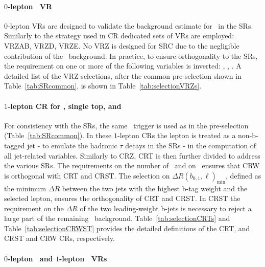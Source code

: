 		\paragraph{$0$-lepton \Zjets\ VR}

			$0$-lepton \acp{VR} are designed to validate the background estimate for \Zjets\ in the \acp{SR}. Similarly to the strategy used in \ac{CR} dedicated sets of \acp{VR} are employed: VRZAB, VRZD, VRZE. No VRZ is designed for SRC due to the negligible contribution of the \Zboson\ background. In practice, to ensure orthogonality to the \acp{SR}, the requirement on one or more of the following variables is inverted: \drbjetbjet, \mantikttwelvezero, \mantikteightzero. A detailed list of the VRZ selections, after the common pre-selection shown in Table~\ref{tab:SRcommon}, is shown in Table~\ref{tab:selectionVRZs}. 

		\paragraph{$1$-lepton CR for \ttbar, single top, and \Wjets}
	
			For consistency with the \acp{SR}, the same \met\ trigger is used as in the pre-selection (Table~\ref{tab:SRcommon}). In these $1$-lepton \acp{CR} the lepton is treated as a non-b-tagged jet - to emulate the hadronic $\tau$ decays in the \acp{SR} - in the computation of all jet-related variables. Similarly to CRZ, CRT is then further divided to address the various \acp{SR}. %
			The requirements on the number of \bjs\ and on \mantikttwelvezero\ ensures that CRW is orthogonal with CRT and CRST. The selection on $\Delta R(b_{0,1},\ell)_{\mathrm{min}}$, defined as the minimum $\Delta R$ between the two jets with the highest b-tag weight and the selected lepton, ensures the orthogonality of CRT and CRST. In CRST the requirement on the $\Delta R$ of the two leading-weight b-jets is necessary to reject a large part of the remaining \ttbar\ background. Table~\ref{tab:selectionCRTs}  and Table~\ref{tab:selectionCRWST} provides the detailed definitions of the CRT, and CRST and CRW \acp{CR}, respectively. 

		\paragraph{$0$-lepton \ttbar\ and $1$-lepton \Wjets\ VRs}

